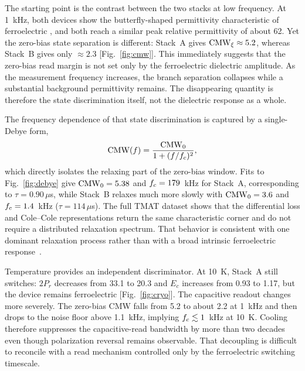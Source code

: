 The starting point is the contrast between the two stacks at low frequency. At 1~kHz, both devices show the butterfly-shaped permittivity characteristic of ferroelectric \hzo{}, and both reach a similar peak relative permittivity of about 62. Yet the zero-bias state separation is different: Stack~A gives $\mathrm{CMW}_\xi \approx 5.2$, whereas Stack~B gives only $\approx 2.3$ [Fig.~\ref{fig:cmw}]. This immediately suggests that the zero-bias read margin is not set only by the ferroelectric dielectric amplitude. As the measurement frequency increases, the branch separation collapses while a substantial background permittivity remains. The disappearing quantity is therefore the state discrimination itself, not the dielectric response as a whole.

The frequency dependence of that state discrimination is captured by a single-Debye form,
\begin{equation}
\mathrm{CMW}(f)=\frac{\mathrm{CMW}_0}{1+(f/f_{c})^2},
\label{eq:debye_short}
\end{equation}
which directly isolates the relaxing part of the zero-bias window. Fits to Fig.~\ref{fig:debye} give $\mathrm{CMW}_0=5.38$ and $f_{c}=179$~kHz for Stack~A, corresponding to $\tau=0.90\,\mu$s, while Stack~B relaxes much more slowly with $\mathrm{CMW}_0=3.6$ and $f_{c}=1.4$~kHz ($\tau=114\,\mu$s). The full TMAT dataset shows that the differential loss and Cole--Cole representations return the same characteristic corner and do not require a distributed relaxation spectrum. That behavior is consistent with one dominant relaxation process rather than with a broad intrinsic ferroelectric response~\cite{jonscher1983,colecole1941}.

Temperature provides an independent discriminator. At 10~K, Stack~A still switches: $2P_r$ decreases from 33.1 to 20.3\uCcm{} and $E_c$ increases from 0.93 to 1.17\MVcm{}, but the device remains ferroelectric [Fig.~\ref{fig:cryo}]. The capacitive readout changes more severely. The zero-bias CMW falls from 5.2 to about 2.2 at 1~kHz and then drops to the noise floor above 1.1~kHz, implying $f_{c} \lesssim 1$~kHz at 10~K. Cooling therefore suppresses the capacitive-read bandwidth by more than two decades even though polarization reversal remains observable. That decoupling is difficult to reconcile with a read mechanism controlled only by the ferroelectric switching timescale.


